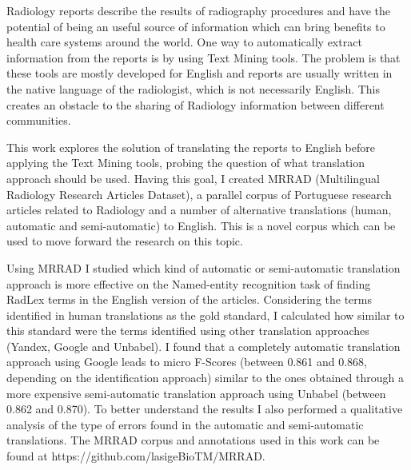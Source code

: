 \begin{abstracts}

Radiology reports describe the results of radiography procedures and have the potential of being an useful source of information which can bring benefits to health care systems around the world. One way to automatically extract information from the reports is by using Text Mining tools. The problem is that these tools are mostly developed for English and reports are usually written in the native language of the radiologist, which is not necessarily English. This creates an obstacle to the sharing of Radiology information between different communities.

This work explores the solution of translating the reports to English before applying the Text Mining tools, probing the question of what translation approach should be used. Having this goal, I created MRRAD (Multilingual Radiology Research Articles Dataset), a parallel corpus of Portuguese research articles related to Radiology and a number of alternative translations (human, automatic and semi-automatic) to English. This is a novel corpus which can be used to move forward the research on this topic.

Using MRRAD I studied which kind of automatic or semi-automatic translation approach is more effective on the Named-entity recognition task of finding RadLex terms in the English version of the articles. Considering the terms identified in human translations as the gold standard, I calculated how similar to this standard were the terms identified using other translation approaches (Yandex, Google and Unbabel). I found that a completely automatic translation approach using Google leads to micro F-Scores (between 0.861 and 0.868, depending on the identification approach) similar to the ones obtained through a more expensive semi-automatic translation approach using Unbabel (between 0.862 and 0.870). To better understand the results I also performed a qualitative analysis of the type of errors found in the automatic and semi-automatic translations. The MRRAD corpus and annotations used in this work can be found at https://github.com/lasigeBioTM/MRRAD.

\end{abstracts}
